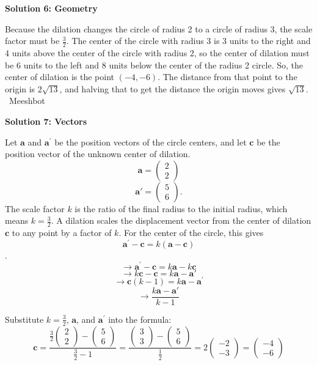 \begin{enumerate}
 



\textbf{Solution 6: Geometry}

Because the dilation changes the circle of radius 2 to a circle of radius 3, the scale factor must be $\frac{3}{2}$. The center of the circle with radius 3 is 3 units to the right and 4 units above the center of the circle with radius 2, so the center of dilation must be 6 units to the left and 8 units below the center of the radius 2 circle. So, the center of dilation is the point $(-4, -6)$. The distance from that point to the origin is $2\sqrt{13}$, and halving that to get the distance the origin moves gives $\boxed{\sqrt{13}}$. ~Meeshbot

 



\textbf{Solution 7: Vectors}

Let \(\mathbf{a}\) and \(\mathbf{a}^{\prime }\) be the position vectors of the circle centers, and let \(\mathbf{c}\) be the position vector of the unknown center of dilation. 
 \[\mathbf{a} = \begin{pmatrix} 2 \\ 2 \end{pmatrix}\] 
 \[\mathbf{a}{\prime} = \begin{pmatrix} 5 \\ 6 \end{pmatrix}.\] The scale factor $k$ is the ratio of the final radius to the initial radius, which means $k=\frac{3}{2}$. A dilation scales the displacement vector from the center of dilation $\mathbf{c}$ to any point by a factor of \(k\). For the center of the circle, this gives 
 \[\mathbf{a}^{\prime }-\mathbf{c}=k(\mathbf{a}-\mathbf{c})\]. 
 \[\to \mathbf{a}^{\prime }-\mathbf{c}=k\mathbf{a}-k\mathbf{c}\]
 \[\to k\mathbf{c}-\mathbf{c}=k\mathbf{a}-\mathbf{a}{\prime}\] 
 \[\to \mathbf{c}(k-1)=k\mathbf{a}-\mathbf{a}^{\prime }\] 
 \[\to \frac{k\mathbf{a} - \mathbf{a}'}{k-1}\]

 Substitute $k = \frac{3}{2}$, $\mathbf{a}$, and $\mathbf{a}^{\prime }$ into the formula:
 \[\mathbf{c}=\frac{\frac{3}{2}\left(\begin{matrix}2\\ 2\end{matrix}\right)-\left(\begin{matrix}5\\ 6\end{matrix}\right)}{\frac{3}{2}-1}=\frac{\left(\begin{matrix}3\\ 3\end{matrix}\right)-\left(\begin{matrix}5\\ 6\end{matrix}\right)}{\frac{1}{2}}=2\left(\begin{matrix}-2\\ -3\end{matrix}\right)=\left(\begin{matrix}-4\\ -6\end{matrix}\right)\]


\end{enumerate}
